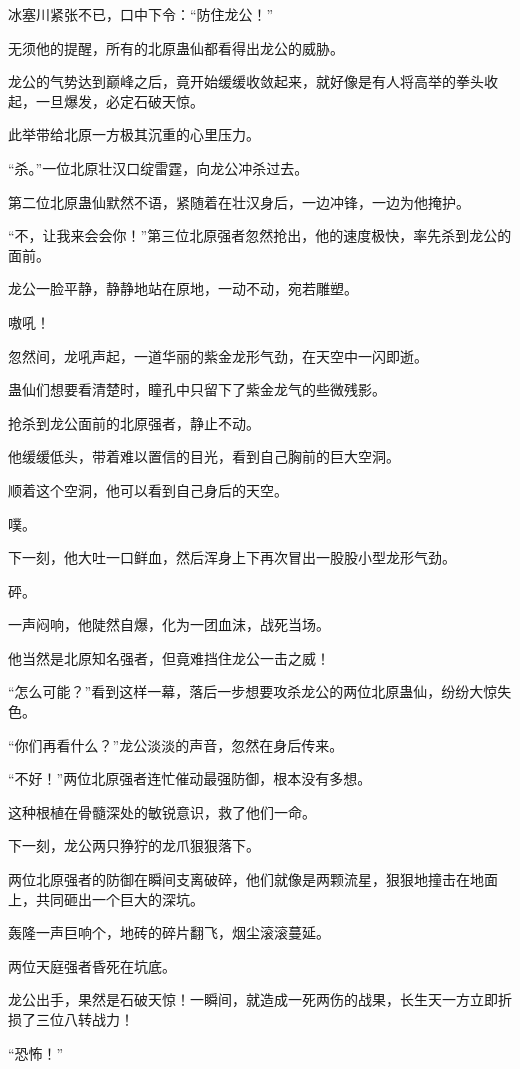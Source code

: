 \begin{this_body}
冰塞川紧张不已，口中下令：“防住龙公！”

无须他的提醒，所有的北原蛊仙都看得出龙公的威胁。

龙公的气势达到巅峰之后，竟开始缓缓收敛起来，就好像是有人将高举的拳头收起，一旦爆发，必定石破天惊。

此举带给北原一方极其沉重的心里压力。

“杀。”一位北原壮汉口绽雷霆，向龙公冲杀过去。

第二位北原蛊仙默然不语，紧随着在壮汉身后，一边冲锋，一边为他掩护。

“不，让我来会会你！”第三位北原强者忽然抢出，他的速度极快，率先杀到龙公的面前。

龙公一脸平静，静静地站在原地，一动不动，宛若雕塑。

嗷吼！

忽然间，龙吼声起，一道华丽的紫金龙形气劲，在天空中一闪即逝。

蛊仙们想要看清楚时，瞳孔中只留下了紫金龙气的些微残影。

抢杀到龙公面前的北原强者，静止不动。

他缓缓低头，带着难以置信的目光，看到自己胸前的巨大空洞。

顺着这个空洞，他可以看到自己身后的天空。

噗。

下一刻，他大吐一口鲜血，然后浑身上下再次冒出一股股小型龙形气劲。

砰。

一声闷响，他陡然自爆，化为一团血沫，战死当场。

他当然是北原知名强者，但竟难挡住龙公一击之威！

“怎么可能？”看到这样一幕，落后一步想要攻杀龙公的两位北原蛊仙，纷纷大惊失色。

“你们再看什么？”龙公淡淡的声音，忽然在身后传来。

“不好！”两位北原强者连忙催动最强防御，根本没有多想。

这种根植在骨髓深处的敏锐意识，救了他们一命。

下一刻，龙公两只狰狞的龙爪狠狠落下。

两位北原强者的防御在瞬间支离破碎，他们就像是两颗流星，狠狠地撞击在地面上，共同砸出一个巨大的深坑。

轰隆一声巨响个，地砖的碎片翻飞，烟尘滚滚蔓延。

两位天庭强者昏死在坑底。

龙公出手，果然是石破天惊！一瞬间，就造成一死两伤的战果，长生天一方立即折损了三位八转战力！

“恐怖！”


\end{this_body}
